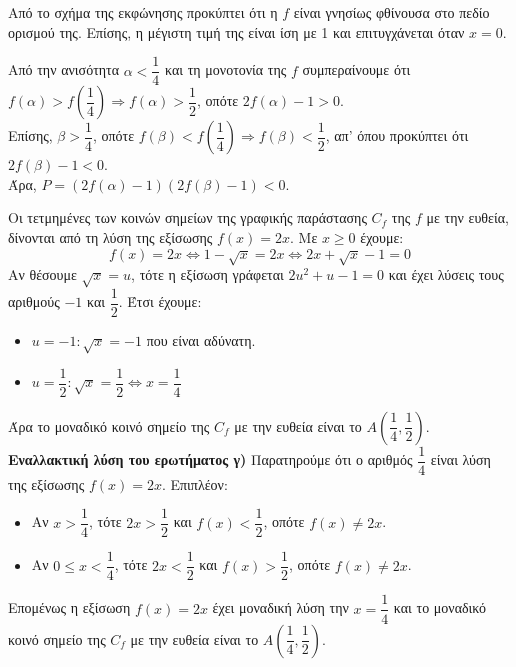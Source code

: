 \begin{alist}
\item Από το σχήμα της εκφώνησης προκύπτει ότι η $f$ είναι γνησίως φθίνουσα στο πεδίο ορισμού της. Επίσης, η μέγιστη τιμή της είναι ίση με 1 και επιτυγχάνεται όταν $x = 0$.
\item Από την ανισότητα $\alpha < \dfrac{1}{4}$ και τη μονοτονία της $f$ συμπεραίνουμε ότι $f(\alpha) > f\left(\dfrac{1}{4}\right) \Rightarrow f(\alpha) > \dfrac{1}{2}$, οπότε $2f(\alpha) - 1 > 0$. \\
Επίσης, $\beta > \dfrac{1}{4}$, οπότε $f(\beta) < f\left(\dfrac{1}{4}\right) \Rightarrow f(\beta) < \dfrac{1}{2}$, απ' όπου προκύπτει ότι $2f(\beta) - 1 < 0$. \\
Άρα, $P = (2f(\alpha) - 1)(2f(\beta) - 1) < 0$.
\item Οι τετμημένες των κοινών σημείων της γραφικής παράστασης $C_f$ της $f$ με την ευθεία, δίνονται από τη λύση της εξίσωσης $f(x) = 2x$. Με $x \ge 0$ έχουμε:
\[f(x) = 2x \Leftrightarrow 1 - \sqrt{x} = 2x \Leftrightarrow 2x + \sqrt{x} - 1 = 0\]
Αν θέσουμε $\sqrt{x} = u$, τότε η εξίσωση γράφεται $2u^2 + u - 1 = 0$ και έχει λύσεις τους αριθμούς $-1$ και $\dfrac{1}{2}$. Έτσι έχουμε:
\begin{itemize}
    \item $u = -1 : \sqrt{x} = -1$ που είναι αδύνατη.
    \item $u = \dfrac{1}{2} : \sqrt{x} = \dfrac{1}{2} \Leftrightarrow x = \dfrac{1}{4}$
\end{itemize}
Άρα το μοναδικό κοινό σημείο της $C_f$ με την ευθεία είναι το $A\left(\dfrac{1}{4}, \dfrac{1}{2}\right)$.
\textbf{Εναλλακτική λύση του ερωτήματος γ)}
Παρατηρούμε ότι ο αριθμός $\dfrac{1}{4}$ είναι λύση της εξίσωσης $f(x) = 2x$. Επιπλέον:
\begin{itemize}
    \item Αν $x > \dfrac{1}{4}$, τότε $2x > \dfrac{1}{2}$ και $f(x) < \dfrac{1}{2}$, οπότε $f(x) \ne 2x$.
    \item Αν $0 \le x < \dfrac{1}{4}$, τότε $2x < \dfrac{1}{2}$ και $f(x) > \dfrac{1}{2}$, οπότε $f(x) \ne 2x$.
\end{itemize}
Επομένως η εξίσωση $f(x) = 2x$ έχει μοναδική λύση την $x = \dfrac{1}{4}$ και το μοναδικό κοινό σημείο της $C_f$ με την ευθεία είναι το $A\left(\dfrac{1}{4}, \dfrac{1}{2}\right)$.
\end{alist}

